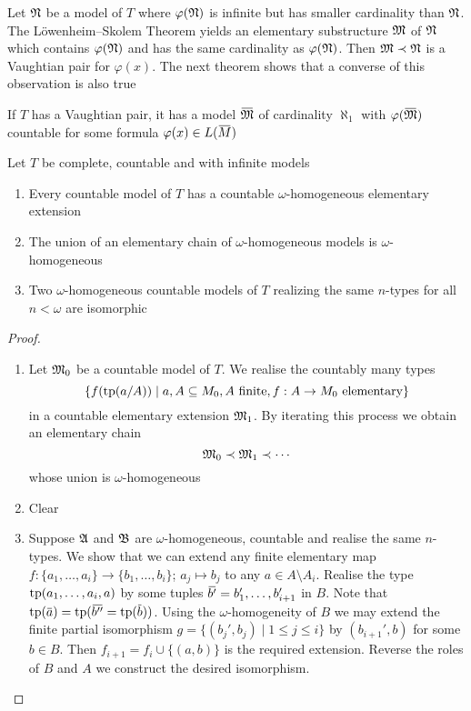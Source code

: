 \documentclass[11pt]{article}
\begin{document}
Let \(\mathfrak{N}\) be a model of \(T\) where \(\varphi(\mathfrak{N})\) is infinite but has smaller cardinality than \(\mathfrak{N}\).
The Löwenheim–Skolem Theorem yields an elementary substructure \(\mathfrak{M}\) of \(\mathfrak{N}\) which
contains \(\varphi(\mathfrak{N})\) and has the same cardinality as \(\varphi(\mathfrak{N})\). Then \(\mathfrak{M}\prec\mathfrak{N}\) is a Vaughtian pair
for \(\varphi(x)\). The next theorem shows that a converse of this observation is also true

\begin{theorem}
\label{thm5.5.2}
If \(T\) has a Vaughtian pair, it has a model \(\barfM\) of cardinality \(\aleph_1\)
with \(\varphi(\barfM)\) countable for some formula \(\varphi(x)\in L(\barM)\)
\end{theorem}

\begin{lemma}[]
\label{lemma5.5.3}
Let \(T\) be complete, countable and with infinite models
\begin{enumerate}
\item Every countable model of \(T\) has a countable \(\omega\)-homogeneous elementary extension
\item The union of an elementary chain of \(\omega\)-homogeneous models is \(\omega\)-homogeneous
\item Two \(\omega\)-homogeneous countable models of \(T\) realizing the same \(n\)-types for all \(n<\omega\)
are isomorphic
\end{enumerate}
\end{lemma}

\begin{proof}
\begin{enumerate}
\item Let \(\mathfrak{M}_0\) be a countable model of \(T\). We realise the countably many types
\begin{equation*}
\{f(\operatorname{tp}(a/A))\mid a,A\subseteq M_0,A\text{ finite},f:A\to M_0\text{ elementary}\}
\end{equation*}
in a countable elementary extension \(\mathfrak{M}_1\). By iterating this process we obtain an elementary
chain
\begin{equation*}
\mathfrak{M}_0\prec\mathfrak{M}_1\prec\cdots
\end{equation*}
whose union is \(\omega\)-homogeneous
\item Clear
\item Suppose \(\mathfrak{A}\) and \(\mathfrak{B}\) are \(\omega\)-homogeneous, countable and realise the same \(n\)-types. We
show that we can extend any finite elementary map \(f:\{a_1,\dots,a_i\}\to\{b_1,\dots,b_i\}\); \(a_j\mapsto b_j\) to
any \(a\in A\setminus A_i\). Realise the type \(\operatorname{tp}(a_1,\dots,a_i,a)\) by some
tuples \(\bbar{b'}=b_1',\dots,b_{i+1}'\) in \(B\). Note
that \(\tp(\bara)=\tp(\bbar{b''}=\tp(\barb))\). Using the \(\omega\)-homogeneity of \(B\) we may extend
the finite partial isomorphism \(g=\{(b_j',b_j)\mid 1\le j\le i\}\) by \((b_{i+1}',b)\) for
some \(b\in B\). Then \(f_{i+1}=f_i\cup\{(a,b)\}\) is the required extension. Reverse the roles
of \(B\) and \(A\) we construct the desired isomorphism.
\end{enumerate}
\end{proof}
\end{document}

